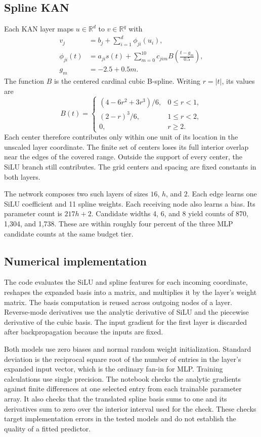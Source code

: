 \documentclass[11pt,twocolumn,letterpaper]{article}
\begin{document}
\subsection{Spline KAN}
Each KAN layer maps \(u\in\mathbb R^d\) to \(v\in\mathbb R^q\) with
\begin{align}
v_j &= b_j+\sum_{i=1}^{d}\phi_{ji}(u_i),\\
\phi_{ji}(t)&=a_{ji}s(t)+\sum_{m=0}^{10} c_{jim}
 B\!\left(\frac{t-g_m}{0.5}\right),\\
g_m&=-2.5+0.5m .
\end{align}
The function \(B\) is the centered cardinal cubic B-spline. Writing \(r=|t|\), its values are
\begin{equation}
 B(t)=
 \begin{cases}
 (4-6r^2+3r^3)/6,&0\leq r<1,\\
 (2-r)^3/6,&1\leq r<2,\\
 0,&r\geq 2.
 \end{cases}
\end{equation}
Each center therefore contributes only within one unit of its location in the unscaled layer coordinate. The finite set of centers loses its full interior overlap near the edges of the covered range. Outside the support of every center, the SiLU branch still contributes. The grid centers and spacing are fixed constants in both layers.

The network composes two such layers of sizes \(16\), \(h\), and \(2\). Each edge learns one SiLU coefficient and 11 spline weights. Each receiving node also learns a bias. Its parameter count is \(217h+2\). Candidate widths 4, 6, and 8 yield counts of 870, 1,304, and 1,738. These are within roughly four percent of the three MLP candidate counts at the same budget tier.

\subsection{Numerical implementation}
The code evaluates the SiLU and spline features for each incoming coordinate, reshapes the expanded basis into a matrix, and multiplies it by the layer's weight matrix. The basis computation is reused across outgoing nodes of a layer. Reverse-mode derivatives use the analytic derivative of SiLU and the piecewise derivative of the cubic basis. The input gradient for the first layer is discarded after backpropagation because the inputs are fixed.

Both models use zero biases and normal random weight initialization. Standard deviation is the reciprocal square root of the number of entries in the layer's expanded input vector, which is the ordinary fan-in for MLP. Training calculations use single precision. The notebook checks the analytic gradients against finite differences at one selected entry from each trainable parameter array. It also checks that the translated spline basis sums to one and its derivatives sum to zero over the interior interval used for the check. These checks target implementation errors in the tested models and do not establish the quality of a fitted predictor.
\end{document}
